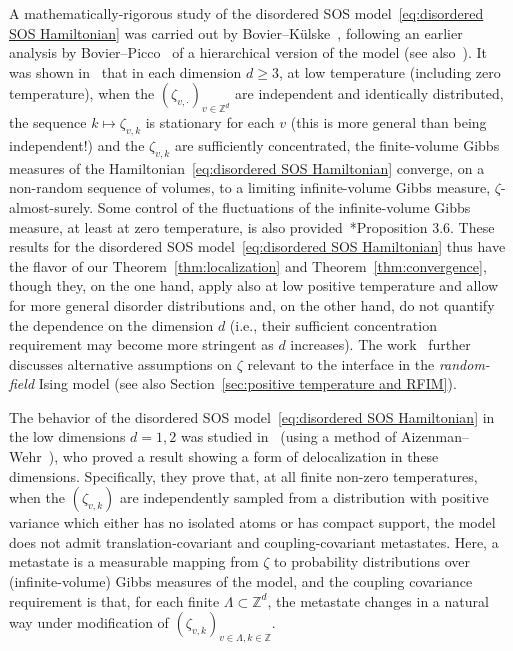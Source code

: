 \documentclass[11pt, reqno]{amsart}
\newcommand{\Z}{\mathbb{Z}}
\numberwithin{equation}{section}
\begin{document}
A mathematically-rigorous study of the disordered SOS model~\eqref{eq:disordered SOS Hamiltonian} was carried out by Bovier--K\"ulske~\cites{BK,BK96}, following an earlier analysis by Bovier--Picco~\cite{BP91} of a hierarchical version of the model (see also~\cites{BK92, BK93}). It was shown in~\cite{BK} that in each dimension $d\ge 3$, at low temperature (including zero temperature), when the $(\zeta_{v,\cdot})_{v\in\Z^d}$ are independent and identically distributed, the sequence $k\mapsto\zeta_{v,k}$ is stationary for each $v$ (this is more general than being independent!) and the $\zeta_{v,k}$ are sufficiently concentrated, the finite-volume Gibbs measures of the Hamiltonian~\eqref{eq:disordered SOS Hamiltonian} converge, on a non-random sequence of volumes, to a limiting infinite-volume Gibbs measure, $\zeta$-almost-surely. Some control of the fluctuations of the infinite-volume Gibbs measure, at least at zero temperature, is also provided~\cite{BK}*{Proposition 3.6}. These results for the disordered SOS model~\eqref{eq:disordered SOS Hamiltonian} thus have the flavor of our Theorem~\ref{thm:localization} and Theorem~\ref{thm:convergence}, though they, on the one hand, apply also at low positive temperature and allow for more general disorder distributions and, on the other hand, do not quantify the dependence on the dimension $d$ (i.e., their sufficient concentration requirement may become more stringent as $d$ increases). The work~\cite{BK} further discusses alternative assumptions on $\zeta$ relevant to the interface in the \emph{random-field} Ising model (see also Section~\ref{sec:positive temperature and RFIM}).

The behavior of the disordered SOS model~\eqref{eq:disordered SOS Hamiltonian} in the low dimensions $d=1,2$ was studied in~\cite{BK96} (using a method of Aizenman--Wehr~\cite{AW90}), who proved a result showing a form of delocalization in these dimensions. Specifically, they prove that, at all finite non-zero temperatures, when the $(\zeta_{v,k})$ are independently sampled from a distribution with positive variance which either has no  isolated atoms or has compact support, the model does not admit translation-covariant and coupling-covariant metastates. Here, a metastate is a measurable mapping from $\zeta$ to probability distributions over (infinite-volume) Gibbs measures of the model, and the coupling covariance requirement is that, for each finite $\Lambda\subset\Z^d$, the metastate changes in a natural way under modification of $(\zeta_{v,k})_{v\in\Lambda, k\in\Z}$.
\end{document}
